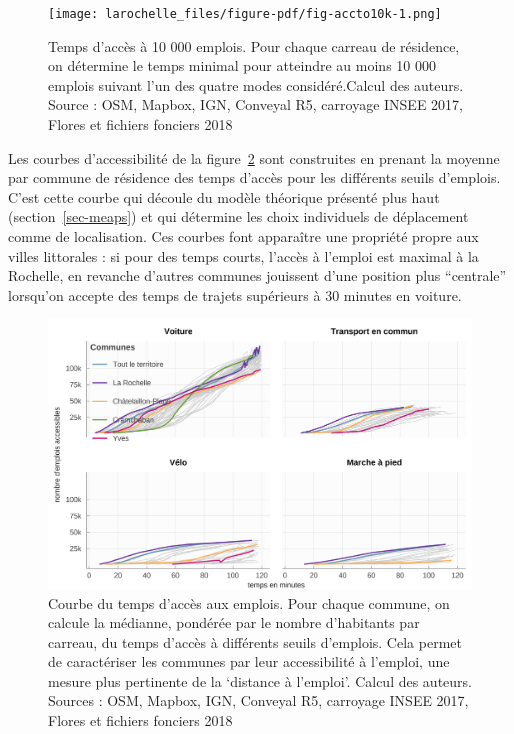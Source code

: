 \documentclass[
  10pt,
  a4paper,
  numbers=noendperiod,
  DIV=9]{scrartcl}
\begin{document}
\begin{figure}[htb]

{\centering \texttt{[image: larochelle\_files/figure-pdf/fig-accto10k-1.png]}

}

\caption{\label{fig-accto10k}Temps d'accès à 10 000 emplois. Pour chaque
carreau de résidence, on détermine le temps minimal pour atteindre au
moins 10 000 emplois suivant l'un des quatre modes considéré.Calcul des
auteurs. Source : OSM, Mapbox, IGN, Conveyal R5, carroyage INSEE 2017,
Flores et fichiers fonciers 2018}

\end{figure}

Les courbes d'accessibilité de la figure~\ref{fig-comaccess} sont
construites en prenant la moyenne par commune de résidence des temps
d'accès pour les différents seuils d'emplois. C'est cette courbe qui
découle du modèle théorique présenté plus haut (section~\ref{sec-meaps})
et qui détermine les choix individuels de déplacement comme de
localisation. Ces courbes font apparaître une propriété propre aux
villes littorales : si pour des temps courts, l'accès à l'emploi est
maximal à la Rochelle, en revanche d'autres communes jouissent d'une
position plus ``centrale'' lorsqu'on accepte des temps de trajets
supérieurs à 30 minutes en voiture.

\begin{figure}[htb]

{\centering \includegraphics[width=1\textwidth,height=\textheight]{larochelle_files/figure-pdf/fig-comaccess-1.png}

}

\caption[Accessibilité par communes pour la
Rochelle]{\label{fig-comaccess}Courbe du temps d'accès aux emplois. Pour
chaque commune, on calcule la médianne, pondérée par le nombre
d'habitants par carreau, du temps d'accès à différents seuils d'emplois.
Cela permet de caractériser les communes par leur accessibilité à
l'emploi, une mesure plus pertinente de la `distance à l'emploi'. Calcul
des auteurs. Sources : OSM, Mapbox, IGN, Conveyal R5, carroyage INSEE
2017, Flores et fichiers fonciers 2018}

\end{figure}
\end{document}
